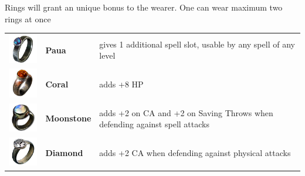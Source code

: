 Rings will grant an unique bonus to the wearer. One can wear maximum two rings at once \\

\begin{tabular}{m{2cm}m{3cm}m{5cm} } 
	\includegraphics[width=2cm]{../Pictures/Gameplay/Items/Wearables/Rings/Paua_ring_icon.png} & \textbf{Paua} & gives 1 additional spell slot, usable by any spell of any level \\ 
	\includegraphics[width=2cm]{../Pictures/Gameplay/Items/Wearables/Rings/Coral_ring_icon.png} & \textbf{Coral} & adds +8 HP \\ 
	\includegraphics[width=2cm]{../Pictures/Gameplay/Items/Wearables/Rings/Moonstone_ring_icon.png} & \textbf{Moonstone} & adds +2 on CA and +2 on Saving Throws when defending against spell attacks \\ 
	\includegraphics[width=2cm]{../Pictures/Gameplay/Items/Wearables/Rings/Diamond_ring_icon.png} & \textbf{Diamond} & adds +2 CA when defending against physical attacks \\ 
\end{tabular}

\clearpage
